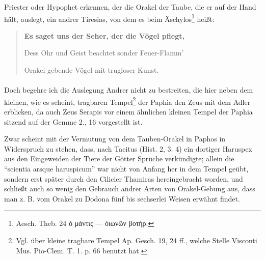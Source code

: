 \documentclass[a4paper, 11pt, oneside, polutonikogreek, german]{article}
\begin{document}
Priester oder Hypophet erkennen, der die Orakel der Taube, die er auf der Hand hält, auslegt, ein andrer Tiresias, von dem es beim Äschylos\footnote{Aesch. Theb. 24 ὁ μάντις --- ὀιωνῶν βοτήρ.} heißt:
\begin{quotation}\footnotesize\bfseries
Es saget uns der Seher, der die Vögel pflegt,  

Dess Ohr und Geist beachtet sonder Feuer-Flamm'

Orakel gebende Vögel mit trugloser Kunst.
\end{quotation}
\paragraph{}
Doch begehre ich die Auslegung Andrer nicht zu bestreiten, die hier neben dem kleinen, wie es scheint, tragbaren Tempel\footnote{Vgl. über kleine tragbare Tempel Ap. Gesch. 19, 24 ff., welche Stelle Visconti Mus. Pio-Clem. T. 1. p. 66 benutzt hat.} der Paphia den Zeus mit dem Adler erblicken, da auch Zeus Serapis vor einem ähnlichen kleinen Tempel der Paphia sitzend auf der Gemme 2., 16 vorgestellt ist.

Zwar scheint mit der Vermutung von dem Tauben-Orakel in Paphos in Widerspruch zu stehen, dass, nach Tacitus (Hist. 2, 3. 4) ein dortiger Haruspex aus den Eingeweiden der Tiere der Götter Sprüche verkündigte; allein die "`scientia arsque haruspicum"' war nicht von Anfang her in dem Tempel geübt, sondern erst später durch den Cilicier Thamiras hereingebracht worden, und schließt auch so wenig den Gebrauch andrer Arten von Orakel-Gebung aus, dass man z. B. vom Orakel zu Dodona fünf bis sechserlei Weisen erwähnt findet.
\end{document}
